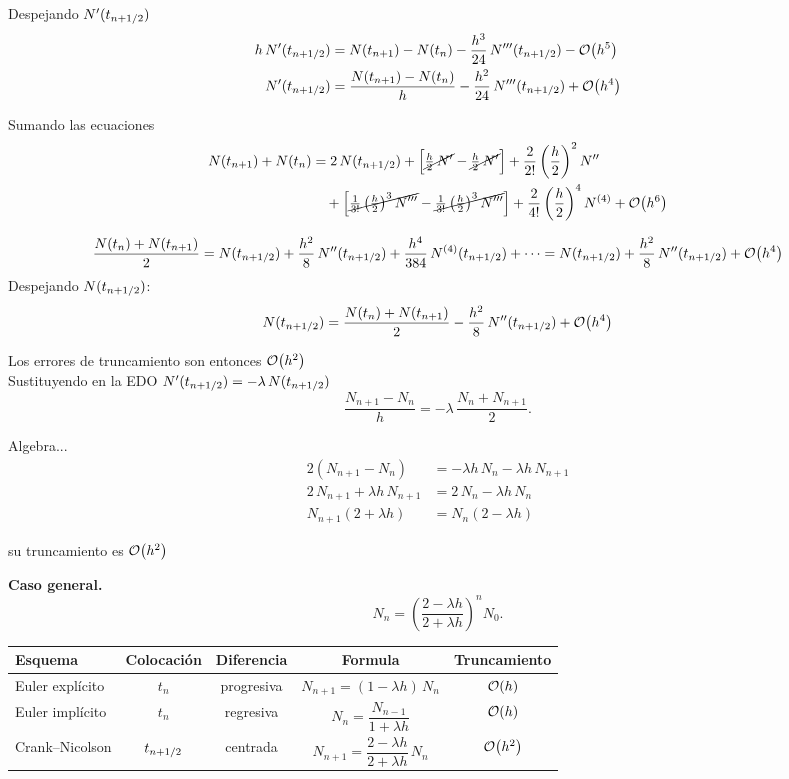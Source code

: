 Despejando $N'(t_{n+1/2})$
\begin{align*}
	h\,N'(t_{n+1/2}) &= N(t_{n+1}) - N(t_n) - \frac{h^3}{24}\,N'''(t_{n+1/2}) - \mathcal{O}\!\left(h^5\right)\\
	N'(t_{n+1/2}) &= \frac{N(t_{n+1}) - N(t_n)}{h} - \frac{h^2}{24}\,N'''(t_{n+1/2}) + \mathcal{O}\!\left(h^4\right)
\end{align*}

Sumando las ecuaciones
\begin{align*}
	N(t_{n+1}) + N(t_n)
	&= 2\,N(t_{n+1/2})
	+ \Bigl[\cancel{\tfrac{h}{2}\,N'} - \cancel{\tfrac{h}{2}\,N'}\Bigr]
	+ \frac{2}{2!}\left(\frac{h}{2}\right)^2 N''\\
	&\quad + \Bigl[\cancel{\tfrac{1}{3!}\left(\tfrac{h}{2}\right)^3 N'''} - \cancel{\tfrac{1}{3!}\left(\tfrac{h}{2}\right)^3 N'''}\Bigr]
	+ \frac{2}{4!}\left(\frac{h}{2}\right)^4 N^{(4)} + \mathcal{O}\!\left(h^6\right)
\end{align*}

\[
\frac{N(t_n) + N(t_{n+1})}{2} = N(t_{n+1/2}) + \frac{h^2}{8}\,N''(t_{n+1/2}) + \frac{h^4}{384}\,N^{(4)}(t_{n+1/2}) + \cdots
= N(t_{n+1/2}) + \frac{h^2}{8}\,N''(t_{n+1/2}) + \mathcal{O}\!\left(h^4\right)
\]
Despejando $N(t_{n+1/2})$:
\[
N(t_{n+1/2}) = \frac{N(t_n) + N(t_{n+1})}{2} - \frac{h^2}{8}\,N''(t_{n+1/2}) + \mathcal{O}\!\left(h^4\right)
\]

Los errores de truncamiento son entonces $\mathcal{O}\!\left(h^2\right)$ 
\\
Sustituyendo en la EDO
$N'(t_{n+1/2}) = -\lambda\,N(t_{n+1/2})$
\[
\frac{N_{n+1} - N_n}{h} = -\lambda\,\frac{N_n + N_{n+1}}{2}.
\]

Algebra...
\begin{align*}
	2\left(N_{n+1} - N_n\right) &= -\lambda h\,N_n - \lambda h\,N_{n+1}\\
	2\,N_{n+1} + \lambda h\,N_{n+1} &= 2\,N_n - \lambda h\,N_n\\
	N_{n+1}\left(2 + \lambda h\right) &= N_n\left(2 - \lambda h\right)
\end{align*}


su truncamiento es $\mathcal{O}\!\left(h^2\right)$

\textbf{Caso general.}
\[
N_n = \left(\frac{2 - \lambda h}{2 + \lambda h}\right)^n N_0 .
\]

\begin{center}
	\begin{tabular}{lcccc}\toprule
		Esquema & Colocación & Diferencia & Formula & Truncamiento\\\midrule
		Euler explícito & $t_n$    & progresiva          & $N_{n+1} = (1 - \lambda h)\,N_n$                          & $\mathcal{O}\!\left(h\right)$\\[2pt]
		Euler implícito & $t_n$    & regresiva           & $N_n = \dfrac{N_{n-1}}{1 + \lambda h}$                    & $\mathcal{O}\!\left(h\right)$\\[6pt]
		Crank--Nicolson & $t_{n+1/2}$ & centrada & $N_{n+1} = \dfrac{2 - \lambda h}{2 + \lambda h}\,N_n$      & $\mathcal{O}\!\left(h^2\right)$\\\bottomrule
	\end{tabular}
\end{center}

